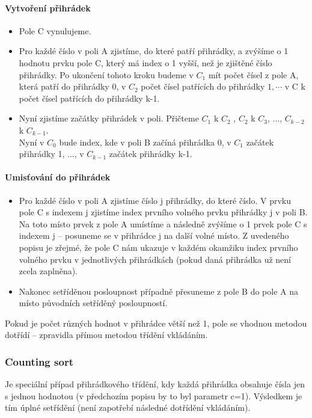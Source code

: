 \documentclass[10pt,a4paper]{article}
\begin{document}
\paragraph{Vytvoření přihrádek}
\begin{itemize}
	\item Pole C vynulujeme.
	\item Pro každé číslo v poli A zjistíme, do které patří přihrádky, a zvýšíme o 1 hodnotu prvku pole C, který má index o 1 vyšší, než je zjištěné číslo přihrádky. Po ukončení tohoto kroku budeme v $C_1$ mít počet čísel z pole A, která patří do přihrádky 0, v $C_2$ počet čísel patřících do přihrádky $1, \cdots $ v C k počet čísel patřících do přihrádky k-1.
	\item Nyní zjistíme začátky přihrádek v poli. Přičteme $C_1$ k $C_2$ , $C_2$ k $C_3$, ..., $C_{k-2}$ k $C_{k-1}$. \\
	Nyní v $C_0$ bude index, kde v poli B začíná přihrádka 0, v $C_1$ začátek přihrádky 1, ..., v $C_{k-1}$ začátek přihrádky k-1.
\end{itemize}
\paragraph{Umisťování do přihrádek}
\begin{itemize}
	\item Pro každé číslo v poli A zjistíme číslo j přihrádky, do které číslo. V prvku pole C s indexem j zjistíme index prvního volného prvku přihrádky j v poli B. Na toto místo prvek z pole A umístíme a následně zvýšíme o 1 prvek pole C s indexem j – posuneme se v přihrádce j na další volné místo. Z uvedeného popisu je zřejmé, že pole C nám ukazuje v každém okamžiku index prvního volného prvku v jednotlivých přihrádkách (pokud daná přihrádka už není zcela zaplněna).
	\item Nakonec setříděnou posloupnost případně přesuneme z pole B do pole A na místo původních setříděný posloupností.
\end{itemize}
Pokud je počet různých hodnot v přihrádce větší než 1, pole se vhodnou metodou dotřídí – zpravidla přímou metodou třídění vkládáním.

\subsubsection{Counting sort}
Je speciální případ přihrádkového třídění, kdy každá přihrádka obsahuje čísla jen s jednou hodnotou (v předchozím popisu by to byl parametr c=1). Výsledkem je tím úplné setřídění (není zapotřebí následné dotřídění vkládáním).
\end{document}
